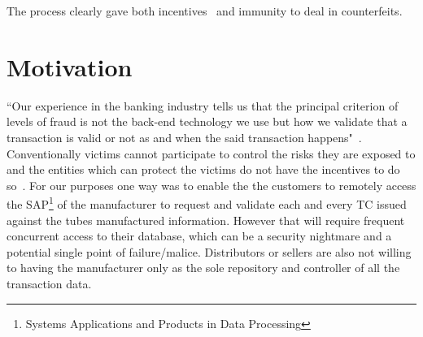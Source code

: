 \documentclass{article}
\begin{document}
The process clearly gave both incentives~\cite{rosscrypto} and immunity 
to deal in counterfeits.

\section{Motivation}
``Our experience in the banking industry tells us that the principal criterion of levels of fraud is not the back-end technology we use but how we validate that a transaction is valid or not as and when the said transaction happens"~\cite{rosscrypto}. Conventionally victims cannot participate to control the risks they are exposed to and the entities which can protect the victims do not have the incentives to do so~\cite{ross}. For our purposes one way was to enable the the customers to remotely access the SAP\footnote{Systems Applications and Products in Data Processing} of the manufacturer to request and validate each and every TC issued against the tubes manufactured information. However that will require frequent concurrent access to their database, which can be a security nightmare and a potential single point of failure/malice. %
Distributors or sellers are also not willing to having the manufacturer only as the sole repository and controller of all the transaction data. 
\end{document}
